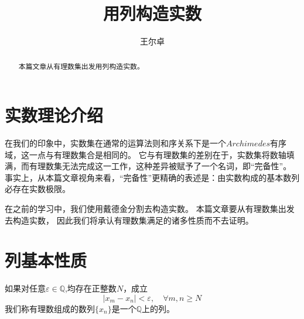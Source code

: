 \documentclass[12pt, a4paper, oneside]{ctexart}
\title{用\text{Cauchy}列构造实数}
\author{王尔卓}
\newcommand{\ep}{\varepsilon}
\begin{document}
\maketitle
\begin{abstract}
    本篇文章从有理数集出发用列构造实数。
\end{abstract}
\tableofcontents
\newpage
\section{实数理论介绍}
在我们的印象中，实数集在通常的运算法则和序关系下是一个$Archimedes$有序域，这一点与有理数集合是相同的。
它与有理数集的差别在于，实数集将数轴填满，而有理数集无法完成这一工作，这种差异被赋予了一个名词，即“完备性”。
事实上，从本篇文章视角来看，“完备性”更精确的表述是：由实数构成的基本数列必存在实数极限。


在之前的学习中，我们使用戴德金分割去构造实数。
本篇文章要从有理数集出发去构造实数，
因此我们将承认有理数集满足的诸多性质而不去证明。
\section{列基本性质}
如果对任意$\ep\in\mathbb{Q}$,均存在正整数$N$，成立
\begin{equation*}
    |x_{m}-x_{n}|<\ep,\quad \forall m,n\ge N
\end{equation*}
我们称有理数组成的数列$\{x_{n}\}$是一个$\mathbb{Q}$上的列。
\end{document}
